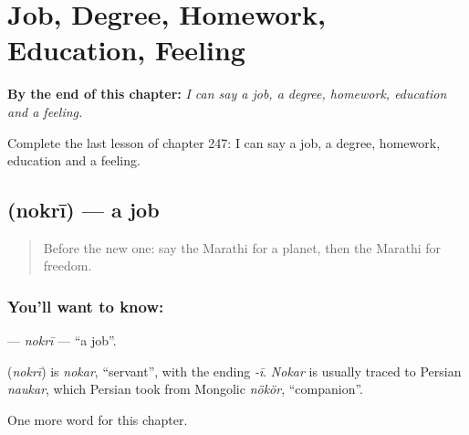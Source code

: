 
\chapter{Job, Degree, Homework, Education, Feeling}
\label{ch:mr-job-degree-homework-education-feeling}

\begin{chapteropening}
\textbf{By the end of this chapter:} \emph{I can say a job, a degree, homework, education and a feeling.}

Complete the last lesson of chapter 247: I can say a job, a degree, homework, education and a feeling.
\end{chapteropening}

\section[\texorpdfstring{\mr{नोकरी} (nokrī)}{नोकरी (nokrī)}]{ (nokrī) — a job}

\label{lesson:MR-C247-nokri}



\begin{quote}
Before the new one: say the Marathi for a planet, then the Marathi for freedom.
\end{quote}

\subsection*{You'll want to know: }
\textbf{} — \emph{nokrī} — \textquotedblleft{}a job\textquotedblright{}.

\begin{cousinweb}
\textbf{} (\emph{nokrī}) is \emph{nokar}, \textquotedblleft{}servant\textquotedblright{}, with the ending \emph{-ī}. \emph{Nokar} is usually traced to Persian \emph{naukar}, which Persian took from Mongolic \emph{nökör}, \textquotedblleft{}companion\textquotedblright{}.
\end{cousinweb}

\begin{grammarlens}[title={What you've built}]
One more word for this chapter.
\end{grammarlens}

